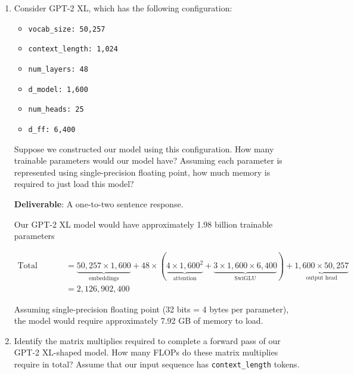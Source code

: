 \begin{enumerate}[label=(\alph*)]
    \item Consider GPT-2 XL, which has the following configuration:
    \begin{itemize}
        \item \lstinline{vocab_size: 50,257}
        \item \lstinline{context_length: 1,024}
        \item \lstinline{num_layers: 48}
        \item \lstinline{d_model: 1,600}
        \item \lstinline{num_heads: 25}
        \item \lstinline{d_ff: 6,400}
    \end{itemize}
    
    Suppose we constructed our model using this configuration. How many trainable parameters would our model have? Assuming each parameter is represented using single-precision floating point, how much memory is required to just load this model?
    
    \textbf{Deliverable}: A one-to-two sentence response.
    
    \begin{answer}
    Our GPT-2 XL model would have approximately 1.98 billion trainable parameters 
    
    \begin{equation*}
    \begin{aligned}
        \text{Total Parameters} &= \underbrace{50,257 \times 1,600}_{\text{embeddings}} + 48 \times (\underbrace{4 \times 1,600^2}_{\text{attention}} + \underbrace{3 \times 1,600 \times 6,400}_{\text{SwiGLU}}) + \underbrace{1,600 \times 50,257}_{\text{output head}}\\
        &= 2,126,902,400
    \end{aligned}
    \end{equation*}

    Assuming single-precision floating point (32 bits = 4 bytes per parameter), the model would require approximately 7.92 GB of memory to load.
    \end{answer}
    
    \item Identify the matrix multiplies required to complete a forward pass of our GPT-2 XL-shaped model. How many FLOPs do these matrix multiplies require in total? Assume that our input sequence has \lstinline{context_length} tokens.
    

\end{enumerate}
